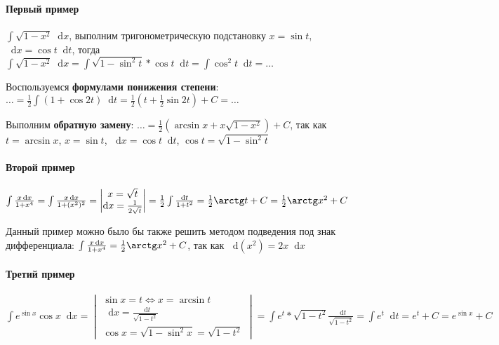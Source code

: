 \documentclass{article}
\newcommand*\diff{\mathop{}\!\mathrm{d}}
\begin{document}
\hfill

\paragraph{Первый пример}

$\int \sqrt{1 - x^2} \diff x$, выполним тригонометрическую подстановку $x = \sin t$, $\diff x = \cos t \diff t$, тогда $\int \sqrt{1 - x^2} \diff x = \int \sqrt{1 - \sin^2 t} * \cos t \diff t = \int \cos^2 t \diff t = \dots$ 

Воспользуемся \textbf{формулами понижения степени}: $\dots = \frac{1}{2} \int (1 + \cos 2 t) \diff t = \frac{1}{2} (t + \frac{1}{2} \sin 2t) + C = \dots$

Выполним \textbf{обратную замену}: $\dots = \frac{1}{2} (\arcsin x + x \sqrt{1 - x^2}) + C$, так как $t = \arcsin x$, $x = \sin t$, $\diff x = \cos t \diff t$, $\cos t = \sqrt{1 - \sin^2 t}$

\paragraph{Второй пример}

$\int \frac{x \diff x}{1 + x^4} = \int \frac{x \diff x}{1 + (x^2)^2} = \begin{vmatrix}
    x = \sqrt{t} \\
    \diff x = \frac{1}{2 \sqrt{t}}
\end{vmatrix} = \frac{1}{2} \int \frac{\diff t}{1 + t^2} = \frac{1}{2} \arctg t + C = \frac{1}{2} \arctg x^2 + C$

Данный пример можно было бы также решить методом подведения под знак дифференциала: $\int \frac{x \diff x}{1 + x^4} = \frac{1}{2} \arctg x^2 + C$, так как $\diff (x^2) = 2 x \diff x$

\paragraph{Третий пример}

$\int e^{\sin x} \cos x \diff x = \begin{vmatrix} 
    \sin x = t \Longleftrightarrow x = \arcsin t \\
    \diff x = \frac{\diff t}{\sqrt{1 - t^2}} \\
    \cos x = \sqrt{1 - \sin^2 x} = \sqrt{1 - t^2}
\end{vmatrix} = \int e^{t} * \sqrt{1 - t^2} \frac{\diff t}{\sqrt{1 - t^2}} = \int e^{t} \diff t = e^{t} + C = e^{\sin x} + C$

\pagebreak
\end{document}
